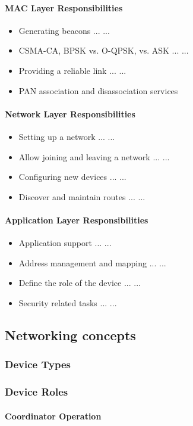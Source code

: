\paragraph{MAC Layer Responsibilities}
\begin{itemize}
\item Generating beacons ... ...
\item CSMA-CA, BPSK vs. O-QPSK, vs. ASK ... ...
\item Providing a reliable link ... ...
\item PAN association and disassociation services
\end{itemize}
\paragraph{Network Layer Responsibilities}
\begin{itemize}
\item Setting up a network ... ...
\item Allow joining and leaving a network ... ...
\item Configuring new devices ... ...
\item Discover and maintain routes ... ...
\end{itemize}
\paragraph{Application Layer Responsibilities}
\begin{itemize}
\item Application support ... ...
\item Address management and mapping ... ...
\item Define the role of the device ... ...
\item Security related tasks ... ...
\end{itemize}
\subsection{Networking concepts}
\subsubsection{Device Types}
\subsubsection{Device Roles}
\paragraph{Coordinator Operation}
